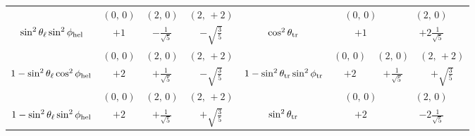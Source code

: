 \begin{table}[p]
\begin{tabular}{| c | c c c c c c || c | c c c c c c |}
                                   &  \multicolumn{2}{c|}{$(0,\,0)$}
                                   &  \multicolumn{2}{c|}{$(2,\,0)$}
                                   &  \multicolumn{2}{c||}{$(2,\,+2)$}            &
                                   &  \multicolumn{3}{c|}{$(0,\,0)$}
                                   &  \multicolumn{3}{c|}{$(2,\,0)$}           \\
    \cline{2-7}\cline{9-14}
    $\sin^2\theta_\ell \sin^2\phi_\text{hel}$  &  \multicolumn{2}{c|}{$+1$}
                                   &  \multicolumn{2}{c|}{$-\frac{1}{\sqrt{5}}$}
                                   &  \multicolumn{2}{c||}{$-\sqrt{\frac{3}{5}}$}  &
    $\cos^2\theta_\text{tr}$               &  \multicolumn{3}{c|}{$+1$}
                                   &  \multicolumn{3}{c|}{$+2\frac{1}{\sqrt{5}}$}  \\
    \hline

                                       &  \multicolumn{2}{c|}{$(0,\,0)$}
                                       &  \multicolumn{2}{c|}{$(2,\,0)$}
                                       &  \multicolumn{2}{c||}{$(2,\,+2)$}            &
                                       &  \multicolumn{2}{c|}{$(0,\,0)$}
                                       &  \multicolumn{2}{c|}{$(2,\,0)$}
                                       &  \multicolumn{2}{c|}{$(2,\,+2)$}             \\
    \cline{2-7}\cline{9-14}
    $1 - \sin^2\theta_\ell \cos^2\phi_\text{hel}$  &  \multicolumn{2}{c|}{$+2$}
                                       &  \multicolumn{2}{c|}{$+\frac{1}{\sqrt{5}}$}
                                       &  \multicolumn{2}{c||}{$-\sqrt{\frac{3}{5}}$}  &
    $1 - \sin^2\theta_\text{tr} \sin^2\phi_\text{tr}$  &  \multicolumn{2}{c|}{$+2$}
                                       &  \multicolumn{2}{c|}{$+\frac{1}{\sqrt{5}}$}
                                       &  \multicolumn{2}{c|}{$+\sqrt{\frac{3}{5}}$}   \\
    \hline

                                       &  \multicolumn{2}{c|}{$(0,\,0)$}
                                       &  \multicolumn{2}{c|}{$(2,\,0)$}
                                       &  \multicolumn{2}{c||}{$(2,\,+2)$}            &
                                       &  \multicolumn{3}{c|}{$(0,\,0)$}
                                       &  \multicolumn{3}{c|}{$(2,\,0)$}           \\
    \cline{2-7}\cline{9-14}
    $1 - \sin^2\theta_\ell \sin^2\phi_\text{hel}$  &  \multicolumn{2}{c|}{$+2$}
                                       &  \multicolumn{2}{c|}{$+\frac{1}{\sqrt{5}}$}
                                       &  \multicolumn{2}{c||}{$+\sqrt{\frac{3}{5}}$}  &
    $\sin^2\theta_\text{tr}$                   &  \multicolumn{3}{c|}{$+2$}
                                       &  \multicolumn{3}{c|}{$-2\frac{1}{\sqrt{5}}$}  \\
    \hline
  \end{tabular}


\end{table}
